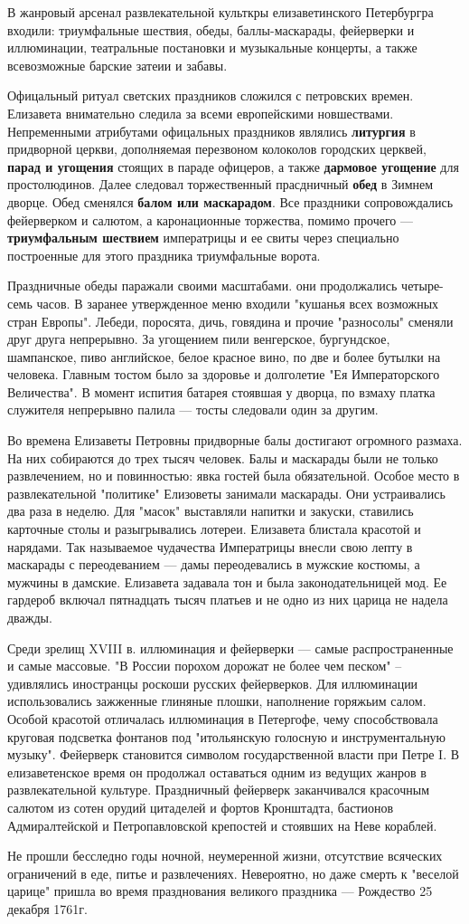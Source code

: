 \newpage
\large{
	В жанровый арсенал развлекательной культкры елизаветинского Петербургра входили: триумфальные шествия, обеды, баллы-маскарады, фейерверки и иллюминации, театральные постановки и музыкальные концерты, а также всевозможные барские затеии и забавы.

	Офицальный ритуал светских праздников сложился с петровских времен. Елизавета внимательно следила за всеми европейскими новшествами. Непременными атрибутами офицальных праздников являлись \textbf{литургия} в придворной церкви, дополняемая перезвоном колоколов городских церквей, \textbf{парад и угощения} стоящих в параде офицеров, а также \textbf{дармовое угощение} для простолюдинов. Далее следовал торжественный прасдничный \textbf{обед} в Зимнем дворце. Обед сменялся \textbf{балом или маскарадом}. Все праздники сопровождались фейерверком и салютом, а каронационные торжества, помимо прочего --- \textbf{триумфальным шествием} императрицы и ее свиты через специально построенные для этого праздника триумфальные ворота.

	Праздничные обеды паражали своими масштабами. они продолжались четыре-семь часов. В заранее утвержденное меню входили "кушанья всех возможных стран Европы". Лебеди, поросята, дичь, говядина и прочие "разносолы" сменяли друг друга непрерывно. За угощением пили венгерское, бургундское, шампанское, пиво английское, белое красное вино, по две и более бутылки на человека. Главным тостом было за здоровье и долголетие "Ея Императорского Величества". В момент испития батарея стоявшая у дворца, по взмаху платка служителя непрерывно палила --- тосты следовали один за другим.

	Во времена Елизаветы Петровны придворные балы достигают огромного размаха. На них собираются до трех тысяч человек. Балы и маскарады были не только развлечением, но и повинностью: явка гостей была обязательной. Особое место в развлекательной "политике" Елизоветы занимали маскарады. Они устраивались два раза в неделю. Для "масок" выставляли напитки и закуски, ставились карточные столы и разыгрывались лотереи. Елизавета блистала красотой и нарядами. Так называемое чудачества Императрицы внесли свою лепту в маскарады с переодеванием --- дамы переодевались в мужские костюмы, а мужчины в дамские. Елизавета задавала тон и была законодательницей мод. Ее гардероб включал пятнадцать тысяч платьев и не одно из них царица не надела дважды.

	Среди зрелищ XVIII в. иллюминация и фейерверки --- самые распространенные и самые массовые. "В России порохом дорожат не более чем песком" -- удивлялись иностранцы роскоши русских фейерверков. Для иллюминации использовались зажженные глиняные плошки, наполнение горяжьим салом. Особой красотой отличалась иллюминация в Петергофе, чему способствовала круговая подсветка фонтанов под "итольянскую голосную и инструментальную музыку". Фейерверк становится символом государственной власти при Петре I. В елизаветенское время он продолжал оставаться одним из ведущих жанров в развлекательной культуре. Праздничный фейерверк заканчивался красочным салютом из сотен орудий цитаделей и фортов Кронштадта, бастионов Адмиралтейской и Петропавловской крепостей и стоявших на Неве кораблей.

	Не прошли бесследно годы ночной, неумеренной жизни, отсутствие всяческих ограничений в еде, питье и развлечениях. Невероятно, но даже смерть к "веселой царице" пришла во время празднования великого праздника --- Рождество 25 декабря 1761г.
}

